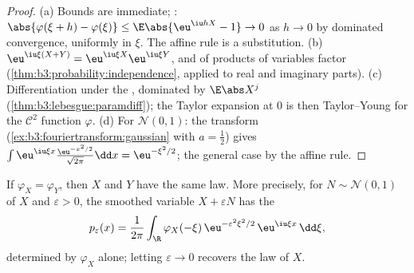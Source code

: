 \begin{proof}
(a) Bounds are immediate; : $\abs{\varphi(\xi + h)
- \varphi(\xi)} \leq \E\abs{\eu^{\iu hX} - 1} \to 0$ as $h
\to 0$ by dominated convergence, uniformly in $\xi$. The
affine rule is a substitution. (b) $\eu^{\iu\xi(X+Y)} =
\eu^{\iu\xi X}\eu^{\iu\xi Y}$, and  of products
of  variables factor
(\cref{thm:b3:probability:independence}, applied to real and
imaginary parts). (c) Differentiation under the ,
dominated by $\E\abs X^j$
(\cref{thm:b3:lebesgue:paramdiff}); the Taylor expansion at
$0$ is then Taylor--Young for the $\mathcal C^2$ function
$\varphi$. (d) For $\mathcal N(0,1)$: the  transform
(\cref{ex:b3:fouriertransform:gaussian} with $a = \frac12$)
gives $\int\eu^{\iu\xi x}\frac{\eu^{-x^2/2}}{\sqrt{2\pi}}\dd
x = \eu^{-\xi^2/2}$; the general case by the affine rule.
\end{proof}

\begin{theorem}[Injectivity]\label{thm:b3:clt:injectivity}
If $\varphi_X = \varphi_Y$, then $X$ and $Y$ have the same
law. More precisely, for $N \sim \mathcal N(0,1)$ 
of $X$ and $\varepsilon > 0$, the smoothed variable $X +
\varepsilon N$ has the 
\[
p_\varepsilon(x) = \frac1{2\pi}\int_\R
\varphi_X(-\xi)\,\eu^{-\varepsilon^2\xi^2/2}\,
\eu^{\iu\xi x}\,\dd\xi ,
\]
determined by $\varphi_X$ alone; letting $\varepsilon \to 0$
recovers the law of $X$.
\end{theorem}

